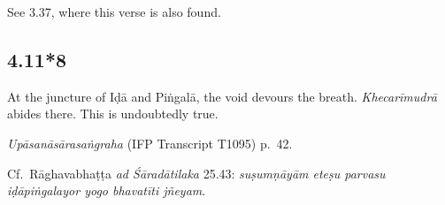 \begin{ekdosis}




\begin{philcomm}[hp04_011_7]
See 3.37, where this verse is also found.
\end{philcomm}

\subsection*{4.11*8}
\begin{translation}[hp04_011_8]
At the juncture of Iḍā and Piṅgalā, the void devours the breath. \emph{Khecarīmudrā} abides there. This is undoubtedly true.
\end{translation}


\begin{testimonia}[hp04_011_8]
\emph{Upāsanāsārasaṅgraha} (IFP Transcript T1095) p.~42.
\begin{versinnote}
\end{versinnote}
\end{testimonia}

\begin{philcomm}[hp04_011_8]
Cf.~Rāghavabhaṭṭa \emph{ad Śāradātilaka} 25.43: \emph{suṣumṇāyām eteṣu parvasu iḍāpiṅgalayor yogo bhavatīti jñeyam}.
\end{philcomm}


\end{ekdosis}
